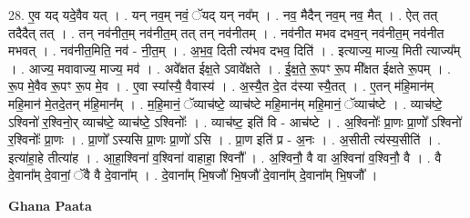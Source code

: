 \documentclass[17pt]{extarticle}
\begin{document}
28. ए॒व यद् यदे॒वैव यत् । . यन् नव॒म् नवं॒ ॅयद् यन् नव᳚म् । . नव॒ मैदैन् नव॒म् नव॒ मैत् । . ऐत् तत् तदैदैत् तत् । . तन् नव॑नीत॒म् नव॑नीत॒म् तत् तन् नव॑नीतम् । . नव॑नीत मभव दभव॒न् नव॑नीत॒म् नव॑नीत मभवत् । . नव॑नीत॒मिति॒ नव॑ - नी॒त॒म् । . अ॒भ॒व॒ दिती त्य॑भव दभव॒ दिति॑ । . इत्याज्य॒ माज्य॒ मिती त्याज्य᳚म् । . आज्य॒ मवावाज्य॒ माज्य॒ मव॑ । . अवे᳚क्षत ईक्ष॒ते ऽवावे᳚क्षते । . ई॒क्ष॒ते॒ रू॒पꣳ रू॒प मी᳚क्षत ईक्षते रू॒पम् । . रू॒प मे॒वैव रू॒पꣳ रू॒प मे॒व । . ए॒वा स्या᳚स्यै॒ वैवास्य॑ । . अ॒स्यै॒त दे॒त द॑स्या स्यै॒तत् । . ए॒तन् म॑हि॒मान॑म् महि॒मान॑ मे॒तदे॒तन् म॑हि॒मान᳚म् । . म॒हि॒मानं॒ ॅव्याच॑ष्टे॒ व्याच॑ष्टे महि॒मान॑म् महि॒मानं॒ ॅव्याच॑ष्टे । . व्याच॑ष्टे॒ ऽश्विनो॑ र॒श्विनो॒र् व्याच॑ष्टे॒ व्याच॑ष्टे॒ ऽश्विनोः᳚ । . व्याच॑ष्ट॒ इति॑ वि - आच॑ष्टे । . अ॒श्विनोः᳚ प्रा॒णः प्रा॒णो᳚ ऽश्विनो॑ र॒श्विनोः᳚ प्रा॒णः । . प्रा॒णो᳚ ऽस्यसि प्रा॒णः प्रा॒णो॑ ऽसि । . प्रा॒ण इति॑ प्र - अ॒नः । . अ॒सीती त्य॑स्य॒सीति॑ । . इत्या॑हा॒हे तीत्या॑ह । . आ॒हा॒श्विना॑ व॒श्विना॑ वाहाहा॒ श्विनौ᳚ । . अ॒श्विनौ॒ वै वा अ॒श्विना॑ व॒श्विनौ॒ वै । . वै दे॒वाना᳚म् दे॒वानां॒ ॅवै वै दे॒वाना᳚म् । . दे॒वाना᳚म् भि॒षजौ॑ भि॒षजौ॑ दे॒वाना᳚म् दे॒वाना᳚म् भि॒षजौ᳚ । \newline

\textbf{Ghana Paata } \newline
\end{document}
